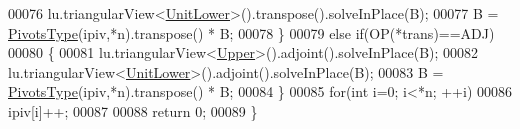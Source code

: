 \begin{DoxyCode}
00076     lu.triangularView<\hyperlink{group__enums_gga39e3366ff5554d731e7dc8bb642f83cda8155cfdfde9e75e7144dff0393d17181}{UnitLower}>().transpose().solveInPlace(B);
00077     B = \hyperlink{group___core___module_class_eigen_1_1_map}{PivotsType}(ipiv,*n).transpose() * B;
00078   \}
00079   \textcolor{keywordflow}{else} \textcolor{keywordflow}{if}(OP(*trans)==ADJ)
00080   \{
00081     lu.triangularView<\hyperlink{group__enums_gga39e3366ff5554d731e7dc8bb642f83cda6bcb58be3b8b8ec84859ce0c5ac0aaec}{Upper}>().adjoint().solveInPlace(B);
00082     lu.triangularView<\hyperlink{group__enums_gga39e3366ff5554d731e7dc8bb642f83cda8155cfdfde9e75e7144dff0393d17181}{UnitLower}>().adjoint().solveInPlace(B);
00083     B = \hyperlink{group___core___module_class_eigen_1_1_map}{PivotsType}(ipiv,*n).transpose() * B;
00084   \}
00085   \textcolor{keywordflow}{for}(\textcolor{keywordtype}{int} i=0; i<*n; ++i)
00086     ipiv[i]++;
00087 
00088   \textcolor{keywordflow}{return} 0;
00089 \}
\end{DoxyCode}
